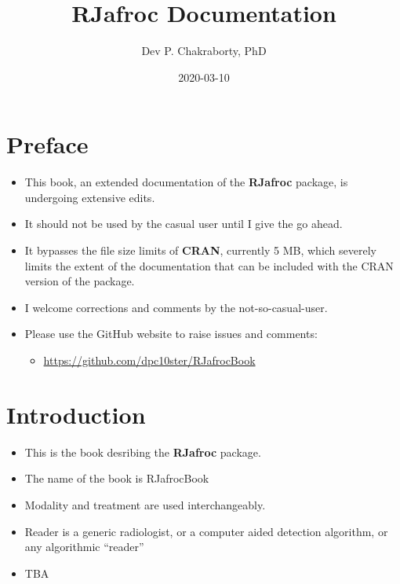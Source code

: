 \documentclass[]{book}
\title{RJafroc Documentation}
\author{Dev P. Chakraborty, PhD}
\date{2020-03-10}
\providecommand{\tightlist}{%
  \setlength{\itemsep}{0pt}\setlength{\parskip}{0pt}}
\begin{document}
\maketitle

{
\setcounter{tocdepth}{1}
\tableofcontents
}
\hypertarget{preface}{%
\chapter*{Preface}\label{preface}}

\begin{itemize}
\tightlist
\item
  This book, an extended documentation of the \textbf{RJafroc} package, is undergoing extensive edits.
\item
  It should not be used by the casual user until I give the go ahead.
\item
  It bypasses the file size limits of \textbf{CRAN}, currently 5 MB, which severely limits the extent of the documentation that can be included with the CRAN version of the package.
\item
  I welcome corrections and comments by the not-so-casual-user.
\item
  Please use the GitHub website to raise issues and comments:

  \begin{itemize}
  \tightlist
  \item
    \url{https://github.com/dpc10ster/RJafrocBook}
  \end{itemize}
\end{itemize}

\hypertarget{intro}{%
\chapter{Introduction}\label{intro}}

\begin{itemize}
\tightlist
\item
  This is the book desribing the \textbf{RJafroc} package.
\item
  The name of the book is RJafrocBook
\item
  Modality and treatment are used interchangeably.
\item
  Reader is a generic radiologist, or a computer aided detection algorithm, or any algorithmic ``reader''
\item
  TBA
\end{itemize}
\end{document}
